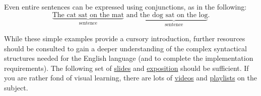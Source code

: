 \documentclass{article}
\begin{document}
    \vspace{2mm}
    Even entire sentences can be expressed using conjunctions, as in the following: 
    $$\underbrace{\text{The cat sat on the mat}}_{\text{sentence}}\text{ and }\underbrace{\text{the dog sat on the log}}_{\text{sentence}}.$$ 

    \vspace{2mm}
    While these simple examples provide a cursory introduction, further resources should be consulted to gain a deeper understanding of the complex syntactical structures needed for the English language (and to complete the implementation requirements). The following set of \href{http://www.cs.columbia.edu/~mcollins/cs4705-spring2020/slides/parsing1.pdf}{slides} and \href{http://faculty.washington.edu/cicero/370syntax.htm}{exposition} should be sufficient. If you are rather fond of visual learning, there are lots of \href{https://www.youtube.com/watch?v=n1zpnN-6pZQ}{videos} and \href{https://www.youtube.com/playlist?list=PLhcpIWud3uA8A-ImaUfWSSE-P-SuTT1Jn}{playlists} on the subject.
\end{document}
